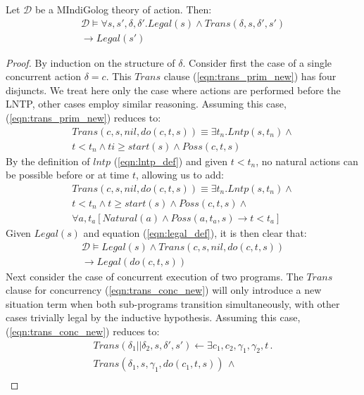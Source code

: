 \documentclass{llncs}
\begin{document}
\begin{theorem}
\label{thm:trans_legal}
Let $\mathcal{D}$ be a MIndiGolog theory of action. Then:
\begin{multline*}
\mathcal{D} \models \forall s,s',\delta,\delta'.Legal(s)\wedge Trans(\delta,s,\delta',s')\\
\rightarrow Legal(s')
\end{multline*}
\end{theorem}

\begin{proof}
By induction on the structure of $\delta$.
Consider first the case of a single concurrent action $\delta=c$.  This
$Trans$ clause (\ref{eqn:trans_prim_new}) has four disjuncts. We treat
here only the
case where actions are performed before the LNTP, other
cases employ similar reasoning.
Assuming this case, (\ref{eqn:trans_prim_new}) reduces to:
\begin{multline*}
Trans(c,s,nil,do(c,t,s)) \equiv \exists t_n . Lntp(s,t_n) \wedge \\
  t < t_n \wedge ti \geq start(s) \wedge Poss(c,t,s)
\end{multline*}
By the definition of $lntp$ (\ref{eqn:lntp_def}) and given $t < t_n$,
no natural actions
can be possible before or at time $t$, allowing us to add:
\begin{multline*}
Trans(c,s,nil,do(c,t,s)) \equiv \exists t_n . Lntp(s,t_n) \wedge \\
  t < t_n \wedge t \geq start(s) \wedge Poss(c,t,s) \wedge\\
  \forall a,t_a \left[ Natural(a) \wedge Poss(a,t_a,s) \rightarrow t < t_a \right]
\end{multline*}
Given $Legal(s)$ and equation (\ref{eqn:legal_def}), it is then clear that:
\begin{multline*}
\mathcal{D} \models Legal(s) \wedge Trans(c,s,nil,do(c,t,s))\\
\rightarrow Legal(do(c,t,s))
\end{multline*}
Next consider the case of concurrent execution of two programs.  The $Trans$
clause  for concurrency (\ref{eqn:trans_conc_new}) will only introduce a
new situation term when both
sub-programs transition simultaneously, with other cases trivially legal by
the inductive hypothesis.  Assuming this case, (\ref{eqn:trans_conc_new})
reduces to:
\begin{multline*}
Trans(\delta_{1}||\delta_{2},s,\delta',s')\leftarrow \exists c_{1},c_{2},\gamma_{1},\gamma_{2},t\,.\\
Trans(\delta_{1},s,\gamma_{1},do(c_{1},t,s))\,\wedge\\

\end{multline*}
\end{proof}
\end{document}
